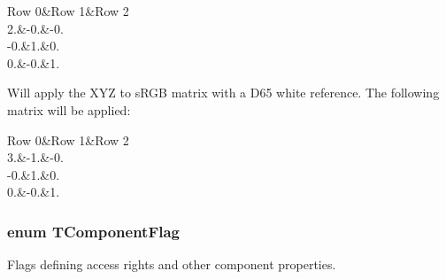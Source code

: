 \begin{Desc}
\begin{description}
\begin{TabularC}{3}
\hline
Row 0&Row 1&Row 2 \\
2.&-\/0.&-\/0. \\
-\/0.&1.&0. \\
0.&-\/0.&1. \\
\end{TabularC}
\item[{\em 
\hypertarget{group___common_interface_gga0892ed0e7e5949707e49bb7d584f8478aca5b58dce7183dab8dc5c2bf07f44fa5}{ctocmm\+X\+Y\+Z\+Tos\+R\+G\+B\+\_\+\+D65}\label{group___common_interface_gga0892ed0e7e5949707e49bb7d584f8478aca5b58dce7183dab8dc5c2bf07f44fa5}
}]Will apply the X\+Y\+Z to s\+R\+G\+B matrix with a D65 white reference. The following matrix will be applied\+:

\begin{TabularC}{3}
\hline
Row 0&Row 1&Row 2 \\
3.&-\/1.&-\/0. \\
-\/0.&1.&0. \\
0.&-\/0.&1. \\
\end{TabularC}
\end{description}
\end{Desc}
\hypertarget{group___common_interface_ga4ef1be7cf1ca9dd256fd3060dd0787bb}{
\subsubsection[{T\+Component\+Flag}]{\setlength{\rightskip}{0pt plus 5cm}enum {\bf T\+Component\+Flag}}}\label{group___common_interface_ga4ef1be7cf1ca9dd256fd3060dd0787bb}


Flags defining access rights and other component properties. 

